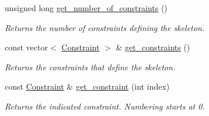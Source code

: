\begin{Indent}
\begin{DoxyCompactItemize}
\mbox{\label{group___c_l_s_solvers_a1fcb6873ce96085aa68f97064cd90c9d}} 
unsigned long \hyperlink{group___c_l_s_solvers_a1fcb6873ce96085aa68f97064cd90c9d}{get\+\_\+number\+\_\+of\+\_\+constraints} ()
\begin{DoxyCompactList}\small\item\em Returns the number of constraints defining the skeleton. \end{DoxyCompactList}\item 
\mbox{\label{group___c_l_s_solvers_a7e1d8c1c056b9ec770f0c9abacdabe5d}} 
const vector$<$ \hyperlink{group___c_l_s_solvers_class_l_p___solvers_1_1_constraint}{Constraint} $>$ \& \hyperlink{group___c_l_s_solvers_a7e1d8c1c056b9ec770f0c9abacdabe5d}{get\+\_\+constraints} ()
\begin{DoxyCompactList}\small\item\em Returns the constraints that define the skeleton. \end{DoxyCompactList}\item 
\mbox{\label{group___c_l_s_solvers_abbc8543d03ed7464149e6dba20f77da1}} 
const \hyperlink{group___c_l_s_solvers_class_l_p___solvers_1_1_constraint}{Constraint} \& \hyperlink{group___c_l_s_solvers_abbc8543d03ed7464149e6dba20f77da1}{get\+\_\+constraint} (int index)
\begin{DoxyCompactList}\small\item\em Returns the indicated constraint. Numbering starts at 0. \end{DoxyCompactList}\end{DoxyCompactItemize}
\end{Indent}

